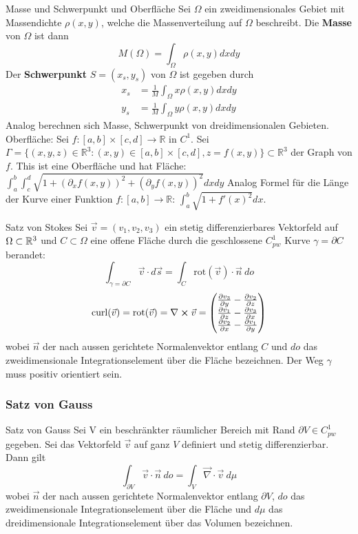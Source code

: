 \begin{Satz}{Masse und Schwerpunkt und Oberfläche}{}
	Sei $\Omega$ ein zweidimensionales Gebiet mit Massendichte $\rho(x, y)$, welche die Massenverteilung auf $\Omega$ beschreibt. Die \textbf{Masse} von $\Omega$ ist dann	
	\[
		M(\Omega) = \int_\Omega \rho(x, y) dx dy
	\]
	Der \textbf{Schwerpunkt} $S=(x_s, y_s)$ von $\Omega$ ist gegeben durch
	\begin{align*}
		x_s &= \frac{1}{M} \int_\Omega x \rho (x, y) dx dy\\
		y_s &= \frac{1}{M} \int_\Omega y \rho (x, y) dx dy
	\end{align*} 
	Analog berechnen sich Masse, Schwerpunkt von dreidimensionalen Gebieten.\\
	Oberfläche: Sei \(f:[a,b] \times [c,d] \rightarrow \mathbb{R}\) in \(C^1\). Sei
	\(\Gamma = \{(x,y,z) \in \mathbb{R}^3 : (x,y) \in [a,b]\times [c,d], z=f(x,y)\} \subset\mathbb{R}^3\)
	der Graph von \(f\). This ist eine Oberfläche und hat Fläche:
	\(\int_a^b\int_c^d\sqrt{1+(\partial_xf(x,y))^2+(\partial_yf(x,y))^2}dxdy\)
	Analog Formel für die Länge der Kurve einer Funktion $f:[a,b] \rightarrow \mathbb{R}$: $\int_a^b\sqrt{1+f'(x)^2}dx.$
\end{Satz}
\begin{Satz}{Satz von Stokes}{}
	Sei $\vec{v} = (v_1, v_2, v_3)$ ein stetig differenzierbares Vektorfeld auf $\Omega \subset \mathbb{R}^3$ und $C \subset \Omega$ eine offene Fläche durch die geschlossene $C^1_{pw}$ Kurve $\gamma = \partial C$ berandet:
	\[
		\int_{\gamma=\partial C} \vec{v} \cdot d\vec{s} = 
		\int_C \text{rot}(\vec v) \cdot \vec n\ do
	\]
	\[
		\text{curl}(\vec v) = \text{rot}(\vec v) = \nabla \crossproduct \vec v = \vek{\frac{\partial v_3}{\partial y} - \frac{\partial v_2}{\partial z} }{ \frac{\partial v_1}{\partial z} - \frac{\partial v_3}{\partial x} }{ \frac{\partial v_2}{\partial x} - \frac{\partial v_1}{\partial y} }	
	\]
	wobei $\vec n$ der nach aussen gerichtete Normalenvektor entlang $C$ und $do$ das zweidimensionale Integrationselement über die Fläche bezeichnen. Der Weg $\gamma$ muss positiv orientiert sein.	
	
\end{Satz}

\subsubsection{Satz von Gauss}

\begin{Satz}{Satz von Gauss}{}
	Sei V ein beschränkter räumlicher Bereich mit Rand $\partial V \in C^1_{pw}$ gegeben. Sei das Vektorfeld $\vec v$ auf ganz $V$ definiert und stetig differenzierbar. Dann gilt
	\[
		\int_{\partial V} \vec v \cdot \vec n\ do = \int_V \vec \nabla \cdot \vec v\ d \mu
	\]
	wobei $\vec n$ der nach aussen gerichtete Normalenvektor entlang $\partial V$, $do$ das zweidimensionale Integrationselement über die Fläche und $d\mu$ das dreidimensionale Integrationselement über das Volumen bezeichnen.
\end{Satz}
